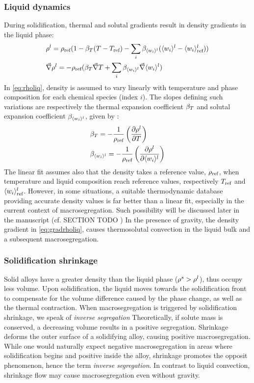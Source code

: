 \subsubsection*{Liquid dynamics}
During solidification, thermal and solutal gradients result in density gradients in the liquid phase: 
\begin{subequations}
\begin{align}
\label{eq:rholiq}
& \rho^l = \rho_{\text{ref}} ( 1 - \beta_T (T - T_{\text{ref}}) - \sum_{i} \beta_{\langle w_i \rangle^l} (\langle w_i \rangle^l - \langle w_i \rangle_{\text{ref}}^l) )  \\ 
\label{eq:gradrholiq}
& \vec{\nabla}\rho^l = -\rho_{\text{ref}} (  \beta_T \vec{\nabla} T + \sum_{i} \beta_{\langle w_i \rangle^l} \vec{\nabla}\langle w_i \rangle^l  )
\end{align}
\end{subequations}
In \cref{eq:rholiq}, density is assumed to vary linearly with temperature and phase composition for each chemical species (index $i$).
The slopes defining such variations are respectively the thermal expansion coefficient $\beta_T$ and solutal expansion coefficient $\beta_{\langle w_i \rangle^l}$, given by \citep{kohler_peritectic_2008}:
\begin{subequations}
\begin{align}
\label{eq:betaT}
& \beta_T =  -\frac{1}{\rho_{\text{ref}}} \left( \frac{\partial\rho^l}{\partial T} \right)  \\ 
\label{eq:betawil}
& \beta_{\langle w_i \rangle^l} = -\frac{1}{\rho_{\text{ref}}} \left( \frac{\partial \rho^l}{\partial \langle w_i \rangle^l} \right)  
\end{align}
\end{subequations}
The linear fit assumes also that the density takes a reference value, $\rho_{\text{ref}}$, when temperature and liquid composition reach reference values, respectively
$T_{\text{ref}}$ and $\langle w_i \rangle_{\text{ref}}^l$. However, in some situations, a suitable thermodynamic database providing accurate density values is far better than a linear fit, especially in the current context of macrosegregation. 
Such possibility will be discussed later in the manuscript (cf. SECTION TODO ) %
In the presence of gravity, the density gradient in \cref{eq:gradrholiq}, causes thermosolutal convection in the liquid bulk and a subsequent macrosegregation.
 
\subsubsection*{Solidification shrinkage}
Solid alloys have a greater density than the liquid phase ($\rho^s > \rho^l$), thus occupy less volume. Upon solidification, the liquid moves towards the solidification front to compensate for the volume difference caused by the phase change, as well as the thermal contraction. When macrosegregation is triggered by solidification shrinkage,
we speak of \emph{inverse segregation} Theoretically, if solute mass is conserved, a decreasing volume results in a positive segregation. Shrinkage deforms the outer
surface of a solidifying alloy, causing positive macrosegregation. While one would naturally expect negative macrosegregation in areas where solidification begins and positive inside the alloy, shrinkage promotes the opposit phenomenon, hence the term \emph{inverse segregation}.
In contrast to liquid convection, shrinkage flow may cause macrosegregation even without gravity.


